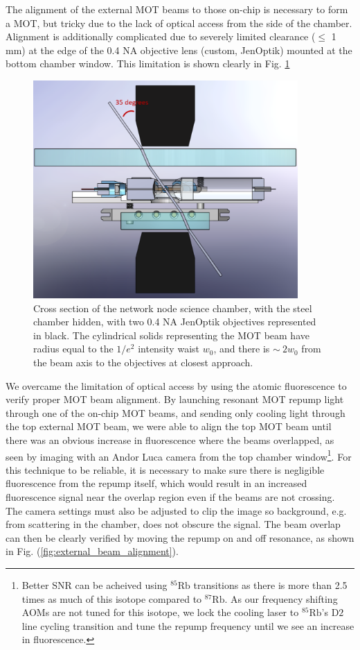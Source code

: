 The alignment of the external MOT beams to those on-chip is necessary to form a MOT,
but tricky due to the lack of optical access from the side of the chamber. Alignment is additionally complicated due to severely limited clearance ($\leq$ 1 mm) at the edge of the 0.4 NA objective lens (custom, JenOptik) mounted at the bottom chamber window. This limitation is shown clearly in Fig. \ref{fig:chamber_cross_section}
\begin{figure}[!ht]
    \centering
    \includegraphics[width=0.9\textwidth]{Images/chamber_cross_section.pdf}
    \caption{Cross section of the network node science chamber, with the steel chamber hidden, with two 0.4 NA JenOptik objectives represented in black. The cylindrical solids representing the MOT beam have radius equal to the $1/e^2$ intensity waist $w_0$, and there is $\sim~2w_0$ from the beam axis to the objectives at closest approach.}
    \label{fig:chamber_cross_section}
\end{figure}
We overcame the limitation of optical access by using the atomic fluorescence to verify proper MOT beam alignment. By launching resonant MOT repump light through one of the on-chip MOT beams, and sending only cooling light through the top external MOT beam, we were able to align the top MOT beam until there was an obvious increase in fluorescence where the beams overlapped, as seen by imaging with an Andor Luca camera from the top chamber window\footnote{Better SNR can be acheived using $^{85}\text{Rb}$ transitions as there is more than 2.5 times as much of this isotope compared to $^{87}\text{Rb}$. As our frequency shifting AOMs are not tuned for this isotope, we lock the cooling laser to $^{85}\text{Rb}$'s $\text{D}2$ line cycling transition and tune the repump frequency until we see an increase in fluorescence.}. For this technique to be reliable, it is necessary to make sure there is negligible fluorescence from the repump itself, which would result in an increased fluorescence signal near the overlap region even if the beams are not crossing. The camera settings must also be adjusted to clip the image so background, e.g. from scattering in the chamber, does not obscure the signal. The beam overlap can then be clearly verified by moving the repump on and off resonance, as shown in Fig. (\ref{fig:external_beam_alignment}).
